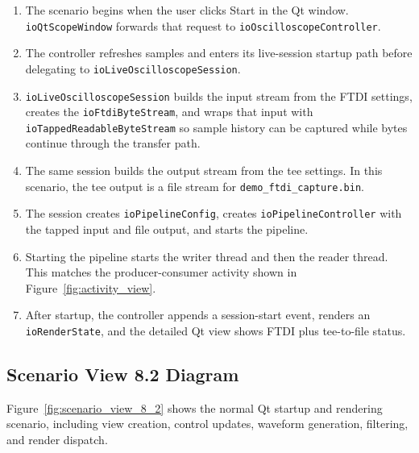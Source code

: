 \begin{enumerate}
    \item The scenario begins when the user clicks Start in the Qt window. \texttt{ioQtScopeWindow} forwards that request to \texttt{ioOscilloscopeController}.
    \item The controller refreshes samples and enters its live-session startup path before delegating to \texttt{ioLiveOscilloscopeSession}.
    \item \texttt{ioLiveOscilloscopeSession} builds the input stream from the FTDI settings, creates the \texttt{ioFtdiByteStream}, and wraps that input with \texttt{ioTappedReadableByteStream} so sample history can be captured while bytes continue through the transfer path.
    \item The same session builds the output stream from the tee settings. In this scenario, the tee output is a file stream for \texttt{demo\_ftdi\_capture.bin}.
    \item The session creates \texttt{ioPipelineConfig}, creates \texttt{ioPipelineController} with the tapped input and file output, and starts the pipeline.
    \item Starting the pipeline starts the writer thread and then the reader thread. This matches the producer-consumer activity shown in Figure~\ref{fig:activity_view}.
    \item After startup, the controller appends a session-start event, renders an \texttt{ioRenderState}, and the detailed Qt view shows FTDI plus tee-to-file status.
\end{enumerate}

\subsection{Scenario View 8.2 Diagram}
\label{Section::Scenario View 8.2 Diagram}


Figure~\ref{fig:scenario_view_8_2} shows the normal Qt startup and rendering scenario, including view creation, control updates, waveform generation, filtering, and render dispatch.

